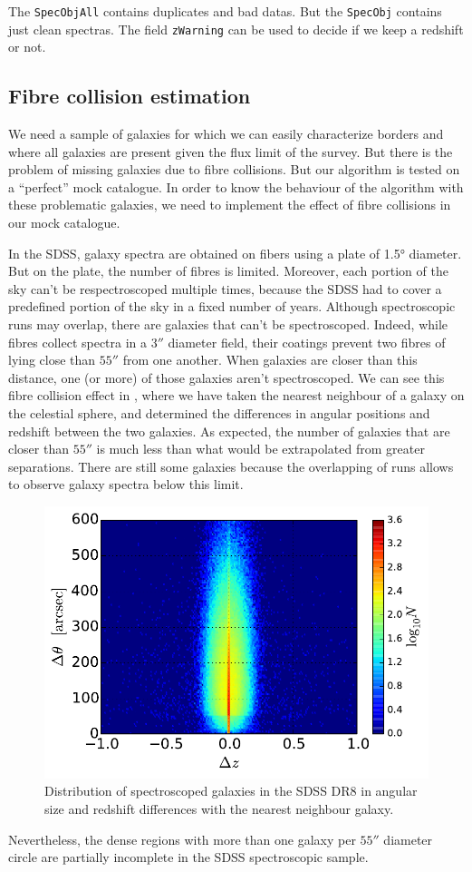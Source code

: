 The \texttt{SpecObjAll} contains duplicates and bad datas. But the
\texttt{SpecObj} contains just clean spectras. The field \texttt{zWarning} can
be used to decide if we keep a redshift or not.

\subsection{Fibre collision estimation}

We need a sample of galaxies for which we can easily characterize borders and
where all galaxies are present given the flux limit of the survey. But there is
the problem of missing galaxies due to fibre collisions. But our algorithm is
tested on a ``perfect'' mock catalogue. In order to know the behaviour of the
algorithm with these problematic galaxies, we need to implement the effect of
fibre collisions in our mock catalogue.

In the SDSS, galaxy spectra are obtained on fibers using a plate of 1.5°
diameter. But on the plate, the number of fibres is limited. Moreover, each
portion of the sky can't be respectroscoped multiple times, because the SDSS
had to cover a predefined portion of the sky in a fixed number of years.
Although spectroscopic runs may overlap, there are galaxies that can't be
spectroscoped. Indeed, while fibres collect spectra in a $3''$ diameter field,
their coatings prevent two fibres of lying close than $55''$ from one another.
When galaxies are closer than this distance, one (or more) of those galaxies
aren't spectroscoped. We can see this fibre collision effect in
, where we have taken the nearest neighbour of a galaxy on
the celestial sphere, and determined the differences in angular positions and
redshift between the two galaxies. As expected, the number of galaxies that are
closer than $55''$ is much less than what would be extrapolated from greater
separations. There are still some galaxies because the overlapping of runs
allows to observe galaxy spectra below this limit.

\begin{figure}[ht] \centering
    \includegraphics[width=0.6\linewidth]{figures/sdss/plane.pdf}
    \caption{\footnotesize{}Distribution of spectroscoped galaxies in the SDSS
    DR8 in angular size and redshift differences with the nearest neighbour
galaxy.\label{fig:plane}} \end{figure}
%
Nevertheless, the dense regions with more than one galaxy per $55''$ diameter
circle are partially incomplete in the SDSS spectroscopic sample.


